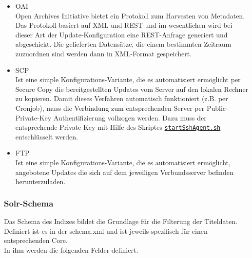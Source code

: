 \documentclass[10pt]{article}
\begin{document}
\begin{itemize}
	\item OAI \\
		Open Archives Initiative bietet ein Protokoll zum Harvesten von Metadaten. Das Protokoll basiert auf XML und REST und im wesentlichen wird bei dieser Art der Update-Konfiguration eine REST-Anfrage generiert und abgeschickt. Die gelieferten Datensätze, die einem bestimmten Zeitraum zuzuordnen sind werden dann in XML-Format gespeichert.
	\item SCP \\ 
		Ist eine simple Konfigurations-Variante, die es automatisiert ermöglicht per Secure Copy die bereitgestellten Updates vom Server auf den lokalen Rechner zu kopieren. Damit dieses Verfahren automatisch funktioniert (z.B. per Cronjob), muss die Verbindung zum entsprechenden Server per Public-Private-Key Authentifizierung vollzogen werden. Dazu muss der entsprechende Private-Key mit Hilfe des Skriptes \hyperref[sec:para:startSshAgent]{\texttt{startSshAgent.sh}} entschlüsselt werden.
	\item FTP \\
		Ist eine simple Konfigurations-Variante, die es automatisiert ermöglicht, angebotene Updates die sich auf dem jeweiligen Verbundsserver befinden herunterzuladen.
\end{itemize}

\subsubsection{Solr-Schema}
Das Schema des Indizes bildet die Grundlage für die Filterung der Titeldaten. Definiert ist es in der schema.xml und ist jeweils spezifisch für einen entsprechenden Core. \\
In ihm werden die folgenden Felder definiert. 
\end{document}
